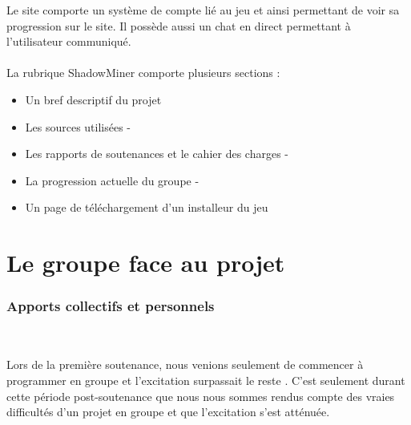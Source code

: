 \documentclass[titlepage, 13px, a4paper]{report}
\begin{document}
Le site comporte un système de compte lié au jeu et ainsi permettant de voir sa progression sur le site.
Il possède aussi un chat en direct permettant à l’utilisateur communiqué. \\ \\

La rubrique ShadowMiner comporte plusieurs sections : \\
{\begin{itemize}
	\item Un bref descriptif du projet
	\item Les sources utilisées
-	\item Les rapports de soutenances et le cahier des charges
-	\item La progression actuelle du groupe
-	\item Un page de téléchargement d’un installeur du jeu
\end{itemize}} 






\part{Le groupe face au projet}

\section{Apports collectifs et personnels}
\paragraph{} \hspace{0pt} \\
Lors de la première soutenance, nous venions seulement de commencer à programmer en groupe et l’excitation surpassait le reste . 
C'est seulement durant cette période post-soutenance que nous nous sommes rendus compte des vraies difficultés 
d'un projet en groupe et que l'excitation s’est atténuée. \\
\end{document}
